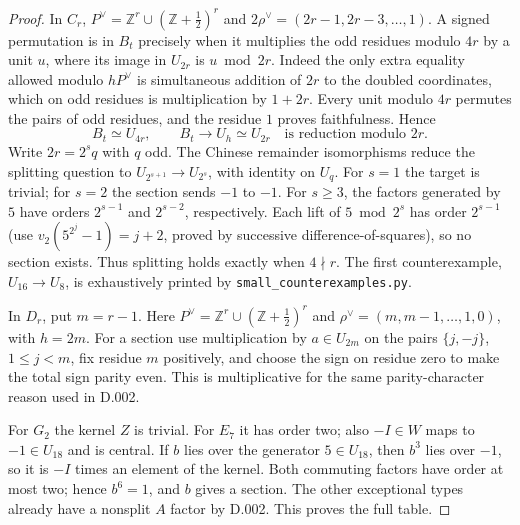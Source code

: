 \begin{proof}
In $C_r$, $P^\vee=\mathbb Z^r\cup(\mathbb Z+\tfrac12)^r$ and
$2\rho^\vee=(2r-1,2r-3,\ldots,1)$.  A signed permutation is in
$B_t$ precisely when it multiplies the odd residues modulo $4r$ by
a unit $u$, where its image in $U_{2r}$ is $u\bmod2r$.  Indeed the
only extra equality allowed modulo $hP^\vee$ is simultaneous addition
of $2r$ to the doubled coordinates, which on odd residues is
multiplication by $1+2r$.  Every unit modulo $4r$ permutes the pairs
of odd residues, and the residue $1$ proves faithfulness.  Hence
\[
 B_t\simeq U_{4r},\qquad B_t\to U_h\simeq U_{2r}
 \quad\text{is reduction modulo }2r.
\]
Write $2r=2^s q$ with $q$ odd.  The Chinese remainder isomorphisms
reduce the splitting question to $U_{2^{s+1}}\to U_{2^s}$, with
identity on $U_q$.  For $s=1$ the target is trivial; for $s=2$ the
section sends $-1$ to $-1$.  For $s\ge3$, the factors generated by
$5$ have orders $2^{s-1}$ and $2^{s-2}$, respectively.  Each lift
of $5\bmod2^s$ has order $2^{s-1}$ (use
$v_2(5^{2^j}-1)=j+2$, proved by successive difference-of-squares),
so no section exists.  Thus splitting holds exactly when $4\nmid r$.
The first counterexample, $U_{16}\to U_8$, is exhaustively printed
by \texttt{small\_counterexamples.py}.

In $D_r$, put $m=r-1$.  Here
$P^\vee=\mathbb Z^r\cup(\mathbb Z+\tfrac12)^r$ and
$\rho^\vee=(m,m-1,\ldots,1,0)$, with $h=2m$.
For a section use multiplication by $a\in U_{2m}$ on the pairs
$\{j,-j\}$, $1\le j<m$, fix residue $m$ positively, and choose
the sign on residue zero to make the total sign parity even.  This
is multiplicative for the same parity-character reason used in D.002.

For $G_2$ the kernel $Z$ is trivial.  For $E_7$ it has order two;
also $-I\in W$ maps to $-1\in U_{18}$ and is central.  If $b$ lies
over the generator $5\in U_{18}$, then $b^3$ lies over $-1$, so it
is $-I$ times an element of the kernel.  Both commuting factors have
order at most two; hence $b^6=1$, and $b$ gives a section.
The other exceptional types already have a nonsplit $A$ factor by
D.002.  This proves the full table.
\end{proof}

